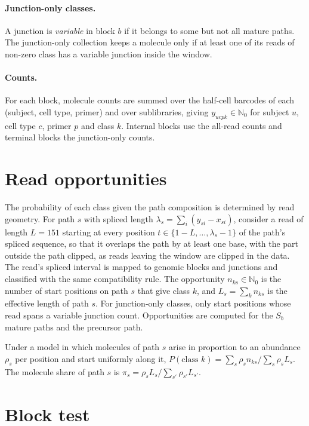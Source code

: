 \documentclass[11pt]{article}
\begin{document}
\paragraph{Junction-only classes.} A junction is \emph{variable} in block $b$ if it belongs to some but not all mature paths. The junction-only collection keeps a molecule only if at least one of its reads of non-zero class has a variable junction inside the window.

\paragraph{Counts.} For each block, molecule counts are summed over the half-cell barcodes of each (subject, cell type, primer) and over sublibraries, giving $y_{ucpk}\in\mathbb N_0$ for subject $u$, cell type $c$, primer $p$ and class $k$. Internal blocks use the all-read counts and terminal blocks the junction-only counts.

\section{Read opportunities}

The probability of each class given the path composition is determined by read geometry. For path $s$ with spliced length $\lambda_s=\sum_i(y_{si}-x_{si})$, consider a read of length $L=151$ starting at every position $t\in\{1-L,\ldots,\lambda_s-1\}$ of the path's spliced sequence, so that it overlaps the path by at least one base, with the part outside the path clipped, as reads leaving the window are clipped in the data. The read's spliced interval is mapped to genomic blocks and junctions and classified with the same compatibility rule. The opportunity $n_{ks}\in\mathbb N_0$ is the number of start positions on path $s$ that give class $k$, and $L_s=\sum_kn_{ks}$ is the effective length of path $s$. For junction-only classes, only start positions whose read spans a variable junction count. Opportunities are computed for the $S_b$ mature paths and the precursor path.

Under a model in which molecules of path $s$ arise in proportion to an abundance $\rho_s$ per position and start uniformly along it, $P(\text{class }k)=\sum_s\rho_sn_{ks}/\sum_s\rho_sL_s$. The molecule share of path $s$ is $\pi_s=\rho_sL_s/\sum_{s'}\rho_{s'}L_{s'}$.

\section{Block test}
\label{sec:block}
\end{document}
